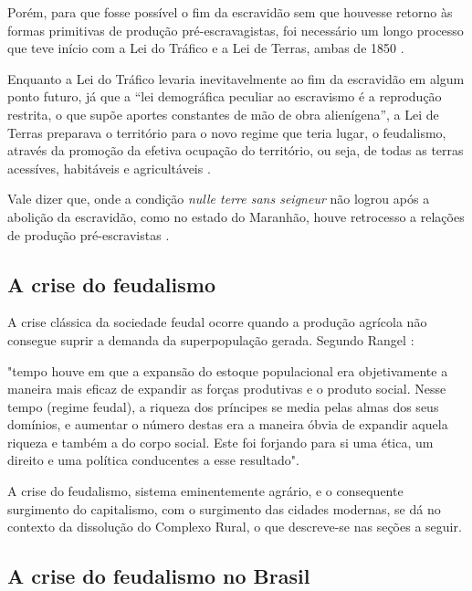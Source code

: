 \documentclass[
	12pt,				%
	oneside,			%
	a4paper,			%
	chapter=TITLE,		%
	section=TITLE,		%
	english,			%
	brazil				%
	]{abntex2}
\begin{document}
Porém, para que fosse possível o fim da escravidão sem que houvesse retorno às
formas primitivas de produção pré-escravagistas, foi necessário um longo
processo que teve início com a Lei do Tráfico e a Lei de Terras, ambas de 1850
\autocite[732]{rangel1989}.

Enquanto a Lei do Tráfico levaria inevitavelmente ao fim da escravidão em algum
ponto futuro, já que a ``lei demográfica peculiar ao escravismo é a reprodução
restrita, o que supõe aportes constantes de mão de obra alienígena'', a Lei de
Terras preparava o território para o novo regime que teria lugar, o feudalismo,
através da promoção da efetiva ocupação do território, ou seja, de todas as
terras acessíves, habitáveis e agricultáveis \autocite[732-733]{rangel1989}.

Vale dizer que, onde a condição \emph{nulle terre sans seigneur} não logrou após a
abolição da escravidão, como no estado do Maranhão, houve retrocesso a relações
de produção pré-escravistas \autocite[733-734]{rangel1989}.

\hypertarget{a-crise-do-feudalismo}{%
\subsection{A crise do feudalismo}\label{a-crise-do-feudalismo}}

A crise clássica da sociedade feudal ocorre quando a produção agrícola não
consegue suprir a demanda da superpopulação gerada. Segundo Rangel
\autocite*[219]{rangel1961}:
\begin{citacao} 
"tempo houve em que a expansão do estoque populacional era objetivamente a
maneira mais eficaz de expandir as forças produtivas e o produto social. Nesse
tempo (regime feudal), a riqueza dos príncipes se media pelas almas dos seus
domínios, e aumentar o número destas era a maneira óbvia de expandir aquela
riqueza e também a do corpo social. Este foi forjando para si uma ética, um
direito e uma política conducentes a esse resultado".
\end{citacao}
A crise do feudalismo, sistema eminentemente agrário, e o consequente surgimento
do capitalismo, com o surgimento das cidades modernas, se dá no contexto da
dissolução do Complexo Rural, o que descreve-se nas seções a seguir.

\hypertarget{a-crise-do-feudalismo-no-brasil}{%
\subsection{A crise do feudalismo no Brasil}\label{a-crise-do-feudalismo-no-brasil}}
\end{document}
